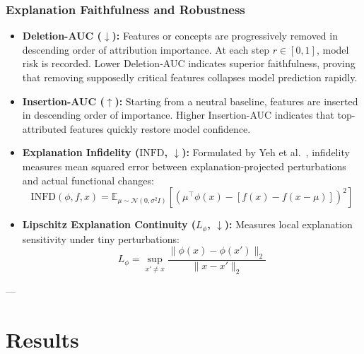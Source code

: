 \documentclass[10pt,journal,compsoc,twocolumn]{IEEEtran}
\begin{document}
\subsubsection{Explanation Faithfulness and Robustness}
\begin{itemize}
    \item \textbf{Deletion-AUC ($\downarrow$):} Features or concepts are progressively removed in descending order of attribution importance. At each step $r \in [0, 1]$, model risk is recorded. Lower Deletion-AUC indicates superior faithfulness, proving that removing supposedly critical features collapses model prediction rapidly.
    \item \textbf{Insertion-AUC ($\uparrow$):} Starting from a neutral baseline, features are inserted in descending order of importance. Higher Insertion-AUC indicates that top-attributed features quickly restore model confidence.
    \item \textbf{Explanation Infidelity ($\text{INFD}$, $\downarrow$):} Formulated by Yeh et al.~\cite{yeh2019on}, infidelity measures mean squared error between explanation-projected perturbations and actual functional changes:
    \begin{equation}
        \text{INFD}(\phi, f, x) = \mathbb{E}_{\mu \sim \mathcal{N}(0, \sigma^2 I)} \left[ \left( \mu^\top \phi(x) - [f(x) - f(x - \mu)] \right)^2 \right]
    \end{equation}
    \item \textbf{Lipschitz Explanation Continuity ($L_\phi$, $\downarrow$):} Measures local explanation sensitivity under tiny perturbations:
    \begin{equation}
        L_\phi = \sup_{x' \neq x} \frac{\|\phi(x) - \phi(x')\|_2}{\|x - x'\|_2}
    \end{equation}
\end{itemize}

---

\section{Results}
\end{document}
